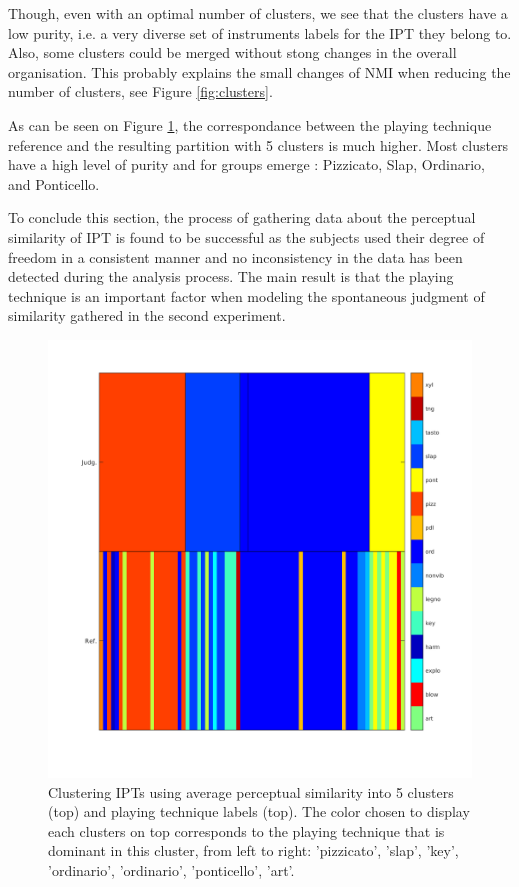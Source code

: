 \documentclass{article}
\makeatletter
\newcommand*{\ie}{i.e.\@\xspace}
\newcommand{\ipt}{IPT\xspace}
\newcommand{\ipts}{IPTs\xspace}
\makeatother
\begin{document}
Though, even with an optimal number of clusters, we see that the clusters have  a low purity, \ie{} a very diverse set of instruments labels for the \ipt they belong to. Also, some clusters could be merged without stong changes in the overall organisation. This probably explains the small changes of NMI when reducing the number of clusters, see Figure \ref{fig:clusters}.

As can be seen on Figure \ref{fig:gm}, the correspondance between the playing technique reference and the resulting partition with 5 clusters is much higher. Most clusters have a high level of purity and for groups emerge : Pizzicato, Slap, Ordinario, and Ponticello.

To conclude this section, the process of gathering data about the perceptual similarity of \ipt is found to be successful as the subjects used their degree of freedom in a consistent manner and no inconsistency in the data has been detected during the analysis process. The main result is that the playing technique is an important factor when modeling the spontaneous judgment of similarity gathered in the second experiment.


\begin{figure}
\center
\includegraphics[width = \textwidth]{figures/groupModes.png}
\caption{Clustering \ipts using average perceptual similarity into 5 clusters (top) and playing technique labels (top). The color chosen to display each clusters on top corresponds to the playing technique that is dominant in this cluster, from left to right: 'pizzicato', 'slap', 'key', 'ordinario', 'ordinario', 'ponticello', 'art'.}
\label{fig:gm}
\end{figure}
\end{document}

